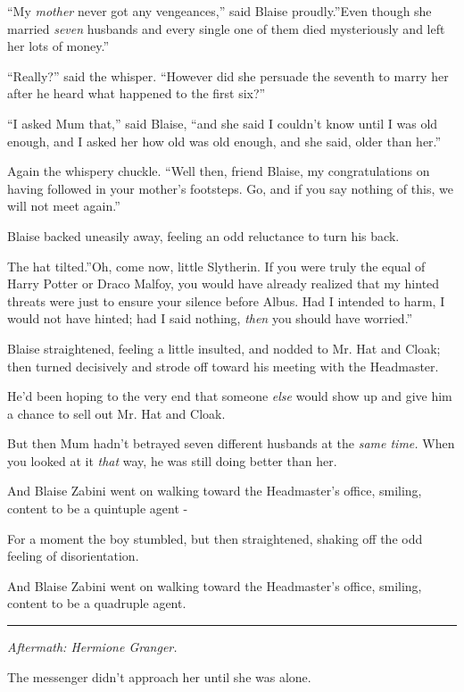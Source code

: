 ``My \emph{mother} never got any vengeances,'' said Blaise proudly.''Even
though she married \emph{seven} husbands and every single one of them
died mysteriously and left her lots of money.''

``Really?'' said the whisper. ``However did she persuade the seventh to
marry her after he heard what happened to the first six?''

``I asked Mum that,'' said Blaise, ``and she said I couldn't know until
I was old enough, and I asked her how old was old enough, and she said,
older than her.''

Again the whispery chuckle. ``Well then, friend Blaise, my
congratulations on having followed in your mother's footsteps. Go, and
if you say nothing of this, we will not meet again.''

Blaise backed uneasily away, feeling an odd reluctance to turn his back.

The hat tilted.''Oh, come now, little Slytherin. If you were truly the
equal of Harry Potter or Draco Malfoy, you would have already realized
that my hinted threats were just to ensure your silence before Albus.
Had I intended to harm, I would not have hinted; had I said nothing,
\emph{then} you should have worried.''

Blaise straightened, feeling a little insulted, and nodded to Mr. Hat
and Cloak; then turned decisively and strode off toward his meeting with
the Headmaster.

He'd been hoping to the very end that someone \emph{else} would show up
and give him a chance to sell out Mr. Hat and Cloak.

But then Mum hadn't betrayed seven different husbands at the \emph{same
time.} When you looked at it \emph{that} way, he was still doing better
than her.

And Blaise Zabini went on walking toward the Headmaster's office,
smiling, content to be a quintuple agent -

For a moment the boy stumbled, but then straightened, shaking off the
odd feeling of disorientation.

And Blaise Zabini went on walking toward the Headmaster's office,
smiling, content to be a quadruple agent.

\begin{center}\rule{3in}{0.4pt}\end{center}

\emph{Aftermath: Hermione Granger.}

The messenger didn't approach her until she was alone.

